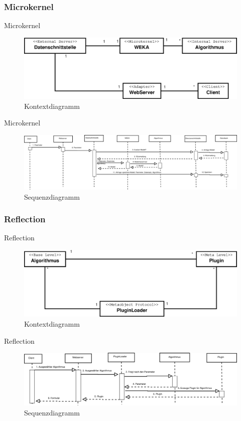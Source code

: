 \documentclass{beamer}
\begin{document}
		\subsubsection{Microkernel}
		\begin{frame}{Microkernel}
			\begin{figure}
				\centering
				\includegraphics[width=0.7\linewidth]{../Grafik/Diagramm/Microkernel}
				\caption{Kontextdiagramm}
				\label{fig:Kontext2}
			\end{figure}
		\end{frame}
		\begin{frame}{Microkernel}
			\begin{figure}[h]	
				\includegraphics[width=1\linewidth]{../Grafik/Diagramm/Szenarios/Berechnung3}
				\caption{Sequenzdiagramm}
				\label{fig:Sequenz2}
			\end{figure}
		\end{frame}
		
		\subsubsection{Reflection}
		\begin{frame}{Reflection}
			\begin{figure}
				\centering
				\includegraphics[width=0.7\linewidth]{../Grafik/Diagramm/Reflection}
				\caption{Kontextdiagramm}
				\label{fig:Kontext3}
			\end{figure}
		\end{frame}
		\begin{frame}{Reflection}	
			\begin{figure}
				\includegraphics[width=1\linewidth]{../Grafik/Diagramm/Szenarios/Berechnung2}
				\caption{Sequenzdiagramm}
				\label{fig:Sequenz3}
			\end{figure}
		\end{frame}
		
\end{document}
